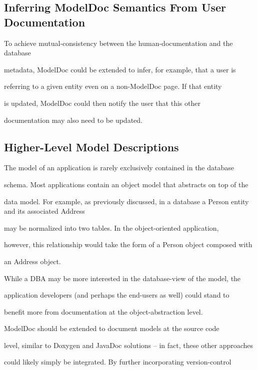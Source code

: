 \documentclass{acm_proc_article-sp}
\begin{document}
\subsection{Inferring ModelDoc Semantics From User Documentation}



To achieve mutual-consistency between the human-documentation and the database

metadata, ModelDoc could be extended to infer, for example, that a user is

referring to a given entity even on a non-ModelDoc page.  If that entity

is updated, ModelDoc could then notify the user that this other

documentation may also need to be updated.



\subsection{Higher-Level Model Descriptions}



The model of an application is rarely exclusively contained in the database

schema.  Most applications contain an object model that abstracts on top of the

data model.  For example, as previously discussed, in a database a Person entity and its associated Address

may be normalized into two tables.  In the object-oriented application,

however, this relationship would take the form of a Person object composed with

an Address object.



While a DBA may be more interested in the database-view of the model, the

application developers (and perhaps the end-users as well) could stand to

benefit more from documentation at the object-abstraction level.



ModelDoc should be extended to document models at the source code

level, similar to Doxygen and JavaDoc solutions -- in fact, these other approaches

could likely simply be integrated.  By further incorporating version-control
\end{document}
